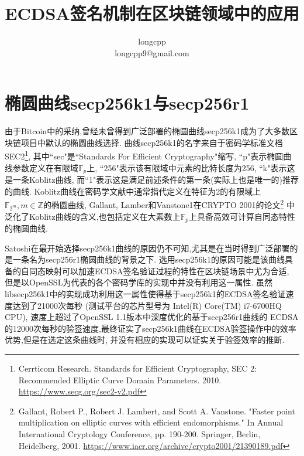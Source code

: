 \documentclass{article}
\newcommand{\Z}{\mathbb{Z}}
\newcommand{\F}{\mathbb{F}}
\begin{document}
\title{ECDSA签名机制在区块链领域中的应用}
\author{longcpp \\ longcpp9@gmail.com}

\maketitle

\section{椭圆曲线secp256k1与secp256r1}

由于Bitcoin中的采纳,曾经未曾得到广泛部署的椭圆曲线secp256k1成为了大多数区块链项目中默认的椭圆曲线选择.
曲线secp256k1的名字来自于密码学标准文档SEC2\footnote{Cerrticom Research. Standards for Efficient Cryptography, 
SEC 2: Recommended Elliptic Curve Domain Parameters. 2010. \url{https://www.secg.org/sec2-v2.pdf}},
其中``sec"是``Standards For Efficient Cryptography"缩写,
``p"表示椭圆曲线参数定义在有限域$\F_p$上, ``256"表示该有限域中元素的比特长度为256, 
``k"表示这是一条Koblitz曲线, 而``1"表示这是满足前述条件的第一条(实际上也是唯一的)推荐的曲线.
Koblitz曲线在密码学文献中通常指代定义在特征为2的有限域上$\F_{2^m}, m\in\Z$的椭圆曲线,
Gallant, Lamber和Vanstone1在CRYPTO 2001的论文\footnote{
Gallant, Robert P., Robert J. Lambert, and Scott A. Vanstone. "Faster point multiplication on elliptic curves with efficient endomorphisms." In Annual International Cryptology Conference, pp. 190-200. Springer, Berlin, Heidelberg, 2001.
\url{https://www.iacr.org/archive/crypto2001/21390189.pdf}}
中泛化了Koblitz曲线的含义,也包括定义在大素数上$\F_p$上具备高效可计算自同态特性的椭圆曲线.

Satoshi在最开始选择secp256k1曲线的原因仍不可知,尤其是在当时得到广泛部署的是一条名为secp256r1椭圆曲线的背景之下.
选用secp256k1的原因可能是该曲线具备的自同态映射可以加速ECDSA签名验证过程的特性在区块链场景中尤为合适,
但是以OpenSSL为代表的各个密码学库的实现中并没有利用这一属性.
虽然libsecp256k1中的实现成功利用这一属性使得基于secp256k1的ECDSA签名验证速度达到了21000次每秒
(测试平台的芯片型号为 Intel(R) Core(TM) i7-6700HQ CPU), 速度上超过了OpenSSL 1.1版本中深度优化的基于secp256r1曲线的
ECDSA的12000次每秒的验签速度,最终证实了secp256k1曲线在ECDSA验签操作中的效率优势,但是在选定这条曲线时,
并没有相应的实现可以证实关于验签效率的推断.
\end{document}
